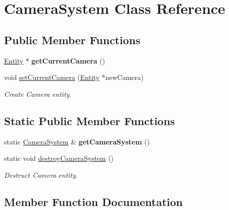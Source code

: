 \hypertarget{class_camera_system}{}\section{Camera\+System Class Reference}
\label{class_camera_system}
\subsection*{Public Member Functions}
\begin{DoxyCompactItemize}
\item 
\hypertarget{class_camera_system_ab239296f4d98cc67e52b707e03158c3e}{}\hyperlink{class_entity}{Entity} $\ast$ {\bfseries get\+Current\+Camera} ()\label{class_camera_system_ab239296f4d98cc67e52b707e03158c3e}

\item 
void \hyperlink{class_camera_system_a3f76e690e088e4cd7b4f554e0ae8f370}{set\+Current\+Camera} (\hyperlink{class_entity}{Entity} $\ast$new\+Camera)
\begin{DoxyCompactList}\small\item\em Create Camera entity. \end{DoxyCompactList}\end{DoxyCompactItemize}
\subsection*{Static Public Member Functions}
\begin{DoxyCompactItemize}
\item 
\hypertarget{class_camera_system_a52ad0c36f96291bef889a896b252b355}{}static \hyperlink{class_camera_system}{Camera\+System} \& {\bfseries get\+Camera\+System} ()\label{class_camera_system_a52ad0c36f96291bef889a896b252b355}

\item 
static void \hyperlink{class_camera_system_add435683e79527bec70a83eac91584b2}{destroy\+Camera\+System} ()
\begin{DoxyCompactList}\small\item\em Destruct Camera entity. \end{DoxyCompactList}\end{DoxyCompactItemize}


\subsection{Member Function Documentation}
\hypertarget{class_camera_system_add435683e79527bec70a83eac91584b2}{}
